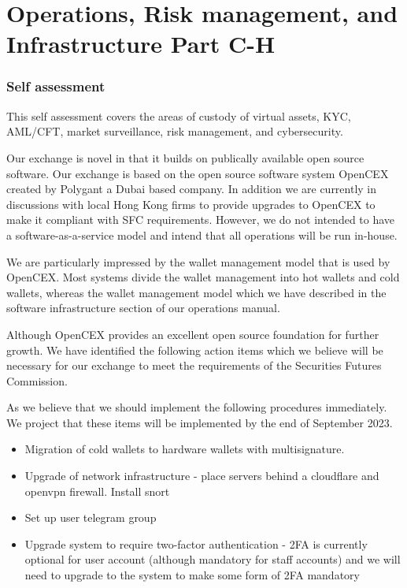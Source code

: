 \documentclass[]{report}
\begin{document}
\chapter{Operations, Risk management, and Infrastructure Part C-H}

\subsection{Self assessment}

This self assessment covers the areas of custody of virtual assets,
KYC, AML/CFT, market surveillance, risk management, and cybersecurity.

Our exchange is novel in that it builds on publically available open
source software.  Our exchange is based on the open source software
system OpenCEX created by Polygant a Dubai based company.  In addition
we are currently in discussions with local Hong Kong firms to provide
upgrades to OpenCEX to make it compliant with SFC requirements.
However, we do not intended to have a software-as-a-service model and
intend that all operations will be run in-house.

We are particularly impressed by the wallet management model that is
used by OpenCEX.  Most systems divide the wallet management into hot
wallets and cold wallets, whereas the wallet management model which we
have described in the software infrastructure section of our
operations manual.

Although OpenCEX provides an excellent open source foundation for
further growth.  We have identified the following action items which
we believe will be necessary for our exchange to meet the requirements
of the Securities Futures Commission.

As we believe that we should implement the following procedures
immediately.  We project that these items will be implemented by the
end of September 2023.

\begin{itemize}
\item Migration of cold wallets to hardware wallets with
  multisignature.

\item Upgrade of network infrastructure - place servers behind a cloudflare and
openvpn firewall.  Install snort

\item Set up user telegram group

\item Upgrade system to require two-factor authentication - 2FA is
  currently optional for user account (although mandatory for staff
  accounts) and we will need to upgrade to the system to make
  some form of 2FA mandatory
\end{itemize}
\end{document}
